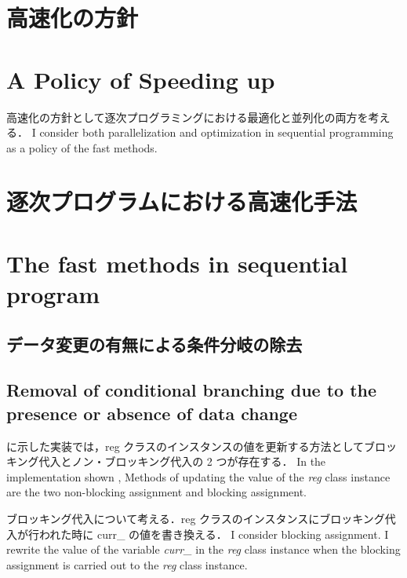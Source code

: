 \section{高速化の方針}
\fi
\section{A Policy of Speeding up}

高速化の方針として逐次プログラミングにおける最適化と並列化の両方を考える．
\fi
I consider both parallelization and optimization in sequential programming
as a policy of the fast methods.

\section{逐次プログラムにおける高速化手法}
\fi
\section{The fast methods in sequential program}

\subsection{データ変更の有無による条件分岐の除去 \label{sss:no_set}}
\fi

\subsection{Removal of conditional branching due to the presence or absence of data change}
\label{sss:no_set}

 に示した実装では，reg クラスのインスタンスの値を更新する方法としてブロッキング代入とノン・ブロッキング代入の 2 つが存在する．
\fi
In the implementation shown ,
Methods of updating the value of the \textit{reg} class instance are the two non-blocking assignment and blocking assignment.

ブロッキング代入について考える．reg クラスのインスタンスにブロッキング代入が行われた時に curr\_ の値を書き換える．
\fi
I consider blocking assignment.
I rewrite the value of the variable \textit{curr\_} in the \textit{reg} class instance
when the blocking assignment is carried out to the \textit{reg} class instance.

